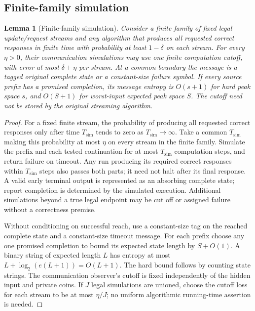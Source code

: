 \documentclass[11pt,letterpaper]{article}
\newtheorem{lemma}[theorem]{Lemma}
\numberwithin{equation}{section}
\begin{document}
\subsection{Finite-family simulation}
\begin{lemma}[Finite-family simulation]
\label{lem:finite-simulation}
Consider a finite family of fixed legal update/request streams and any algorithm that produces all requested correct responses in finite time with probability at least $1-\delta$ on each stream.
For every $\eta>0$, their communication simulations may use one finite computation cutoff, with error at most $\delta+\eta$ per stream.
At a common boundary the message is a tagged original complete state or a constant-size failure symbol.
If every source prefix has a promised completion, its message entropy is $O(s+1)$ for hard peak space $s$, and $O(S+1)$ for worst-input expected peak space $S$.
The cutoff need not be stored by the original streaming algorithm.
\end{lemma}
\begin{proof}
For a fixed finite stream, the probability of producing all requested correct responses only after time $T_{\mathrm{sim}}$ tends to zero as $T_{\mathrm{sim}}\to\infty$.
Take a common $T_{\mathrm{sim}}$ making this probability at most $\eta$ on every stream in the finite family.
Simulate the prefix and each tested continuation for at most $T_{\mathrm{sim}}$ computation steps, and return failure on timeout.
Any run producing its required correct responses within $T_{\mathrm{sim}}$ steps also passes both parts; it need not halt after its final response.
A valid early terminal output is represented as an absorbing complete state; report completion is determined by the simulated execution.
Additional simulations beyond a true legal endpoint may be cut off or assigned failure without a correctness premise.

Without conditioning on successful reach, use a constant-size tag on the reached complete state and a constant-size timeout message.
For each prefix choose any one promised completion to bound its expected state length by $S+O(1)$.
A binary string of expected length $L$ has entropy at most $L+\log_2(e(L+1))=O(L+1)$.
The hard bound follows by counting state strings.
The communication observer's cutoff is fixed independently of the hidden input and private coins.
If $J$ legal simulations are unioned, choose the cutoff loss for each stream to be at most $\eta/J$; no uniform algorithmic running-time assertion is needed.
\end{proof}
\end{document}

